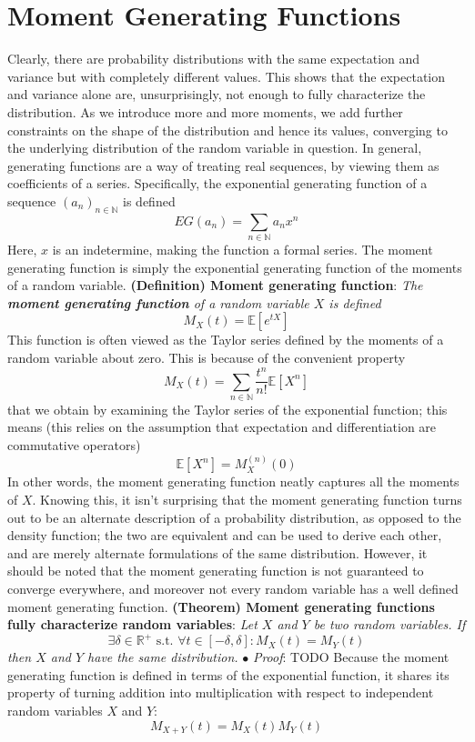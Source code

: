 \documentclass{article}
\newcommand*{\tb}{\textbf}
\newcommand*{\ti}{\textit}
\newcommand*{\n}{\newline}
\newcommand*{\nn}{\newline \newline}
\newcommand*{\Pf}{\indent \ensuremath{\bullet} \textit{Proof}: }
\newcommand*{\st}{\text{ s.t. }}
\newcommand*{\N}{\mathbb{N}}
\newcommand*{\R}{\mathbb{R}}
\newcommand*{\E}{\mathbb{E}}
\begin{document}
\section{Moment Generating Functions}
Clearly, there are probability distributions with the same expectation and variance but with completely different values. This shows that the expectation and variance alone are, unsurprisingly, not enough to fully characterize the distribution. As we introduce more and more moments, we add further constraints on the shape of the distribution and hence its values, converging to the underlying distribution of the random variable in question.
\n
In general, generating functions are a way of treating real sequences, by viewing them as coefficients of a series. Specifically, the exponential generating function of a sequence $ ( a_n )_{n \in \N} $ is defined
$$ EG(a_n) = \sum_{n \in \N} a_n x^n $$
Here, $ x $ is an indetermine, making the function a formal series. The moment generating function is simply the exponential generating function of the moments of a random variable.
\nn
\tb{(Definition) Moment generating function}: \ti{The \tb{moment generating function} of a random variable $ X $ is defined}
$$ M_X(t) = \E[e^{t X}] $$
This function is often viewed as the Taylor series defined by the moments of a random variable about zero. This is because of the convenient property
$$ M_X(t) = \sum_{n \in \N} \frac{t^n}{n!} \E[X^n] $$
that we obtain by examining the Taylor series of the exponential function; this means (this relies on the assumption that expectation and differentiation are commutative operators)
$$ \E[X^n] = M_X^{(n)}(0) $$
In other words, the moment generating function neatly captures all the moments of $ X $. Knowing this, it isn't surprising that the moment generating function turns out to be an alternate description of a probability distribution, as opposed to the density function; the two are equivalent and can be used to derive each other, and are merely alternate formulations of the same distribution. However, it should be noted that the moment generating function is not guaranteed to converge everywhere, and moreover not every random variable has a well defined moment generating function.
\nn
\tb{(Theorem) Moment generating functions fully characterize random variables}: \ti{Let $ X $ and $ Y $ be two random variables. If}
$$ \exists \delta \in \R^+ \st \forall t \in [- \delta, \delta]: M_X(t) = M_Y(t) $$
\indent \ti{then $ X $ and $ Y $ have the same distribution.}
\n
\Pf TODO
\nn
Because the moment generating function is defined in terms of the exponential function, it shares its property of turning addition into multiplication with respect to independent random variables $ X $ and $ Y $:
$$ M_{X + Y}(t) = M_X(t) M_Y(t) $$
\end{document}
